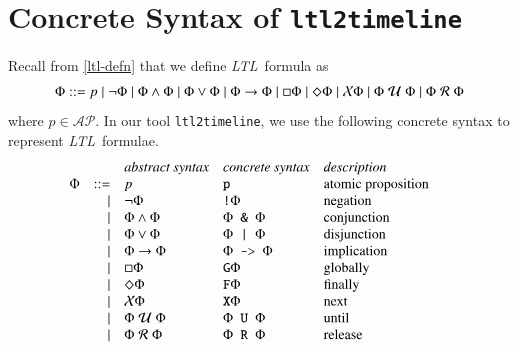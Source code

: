 \documentclass[preprint,12pt]{elsarticle}
\theoremstyle{definition}
\theoremstyle{remark}
\newcommand{\AP}{\mathcal{AP}}
\newcommand{\always}{\Box}
\newcommand{\eventually}{\Diamond}
\newcommand{\nextt}{\mathcal{X}}
\newcommand{\limplies}{\rightarrow}
\newcommand{\ltl}{\textit{LTL}}
\newcommand{\stronguntil}{\hspace{0.1cm} \mathcal{U}  \hspace{0.1cm}}
\newcommand{\weakrelease}{\hspace{0.1cm} \mathcal{R} \hspace{0.1cm}}
\begin{document}
\section{Concrete Syntax of \texttt{ltl2timeline}} \label{sec:concrete-syntax}
Recall from \ref{ltl-defn} that we define \ltl\ formula as
\begin{align*}
    \Phi ::= p \mid \neg \Phi \mid \Phi \land \Phi \mid \Phi \lor \Phi \mid \Phi \limplies \Phi \mid \always \Phi \mid \eventually \Phi \mid \nextt \Phi \mid \Phi \stronguntil \Phi \mid \Phi \weakrelease \Phi
\end{align*}
where $p \in \AP$. In our tool \texttt{ltl2timeline}, we use the following concrete syntax to represent \ltl\ formulae.
\[
    \begin{array}{c r l l l@{\qquad} l}
         &      & \textit{abstract syntax}              & \textit{concrete syntax}                       & \textit{description} \\
    \Phi & ::=  & p                                     & \texttt{p}                                     & \text{atomic proposition} \\
         & \mid & \neg \Phi                             & \texttt{!} \Phi                                & \text{negation} \\
         & \mid & \Phi \land \Phi                       & \Phi \texttt{ \& } \Phi                        & \text{conjunction} \\
         & \mid & \Phi \lor \Phi                        & \Phi \texttt{ | } \Phi                         & \text{disjunction} \\
         & \mid & \Phi \limplies \Phi                   & \Phi \texttt{ -> } \Phi                        & \text{implication} \\
         & \mid & \always \Phi                          & \texttt{G} \Phi                                & \text{globally} \\
         & \mid & \eventually \Phi                      & \texttt{F} \Phi                                & \text{finally} \\
         & \mid & \nextt \Phi                           & \texttt{X} \Phi                                & \text{next} \\
         & \mid & \Phi \stronguntil \Phi                & \Phi \texttt{ U } \Phi                         & \text{until} \\
         & \mid & \Phi \weakrelease \Phi                & \Phi \texttt{ R } \Phi                         & \text{release} \\
    \end{array}
\]



\end{document}
